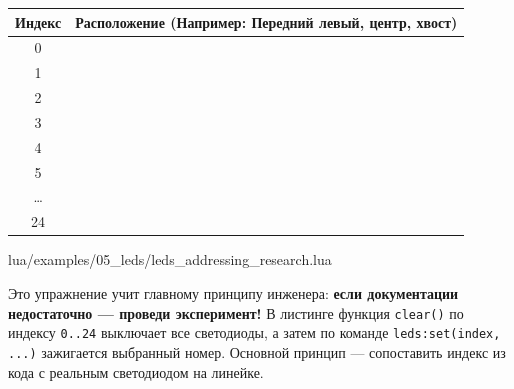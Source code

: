 \begin{center}
\renewcommand{\arraystretch}{1.5}
\begin{tabular}{|c|p{8cm}|}
\hline
\rowcolor{GeoskanBlue!20} \textbf{Индекс} & \textbf{Расположение (Например: Передний левый, центр, хвост)} \\
\hline
0 & \dotfill \\
\hline
1 & \dotfill \\
\hline
2 & \dotfill \\
\hline
3 & \dotfill \\
\hline
4 & \dotfill \\
\hline
5 & \dotfill \\
\hline
\dots & \dotfill \\
\hline
24 & \dotfill \\
\hline
\end{tabular}
\end{center}

\begin{codebox}
\begin{codefile}{lua/examples/05_leds/leds_addressing_research.lua}
\end{codefile}
\end{codebox}

Это упражнение учит главному принципу инженера: \textbf{если документации недостаточно — проведи эксперимент!} В листинге функция \verb|clear()| по индексу \verb|0..24| выключает все светодиоды, а затем по команде \verb|leds:set(index, ...)| зажигается выбранный номер. Основной принцип — сопоставить индекс из кода с реальным светодиодом на линейке.
